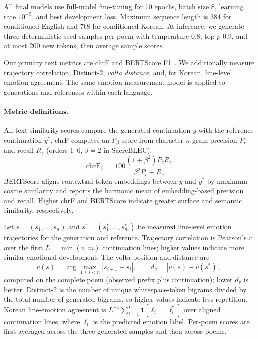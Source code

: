 \documentclass{article}
\begin{document}
All final models use full-model fine-tuning for 10 epochs, batch size 8, learning rate $10^{-5}$, and best development loss. Maximum sequence length is 384 for conditioned English and 768 for conditioned Korean. At inference, we generate three deterministic-seed samples per poem with temperature 0.8, top-$p$ 0.9, and at most 200 new tokens, then average sample scores.

Our primary text metrics are chrF and BERTScore F1~\citep{popovic2015chrf,zhang2020bertscore}. We additionally measure trajectory correlation, Distinct-2, \emph{volta distance}, and, for Korean, line-level emotion agreement. The same emotion measurement model is applied to generations and references within each language.

\paragraph{Metric definitions.}
All text-similarity scores compare the generated continuation $y$ with the reference continuation $y^*$. chrF computes an $F_{\beta}$ score from character $n$-gram precision $P_c$ and recall $R_c$ (orders 1--6, $\beta=2$ in SacreBLEU):
\begin{equation}
\operatorname{chrF}_{\beta}=100\frac{(1+\beta^2)P_cR_c}{\beta^2P_c+R_c}.
\end{equation}
BERTScore aligns contextual token embeddings between $y$ and $y^*$ by maximum cosine similarity and reports the harmonic mean of embedding-based precision and recall. Higher chrF and BERTScore indicate greater surface and semantic similarity, respectively.

Let $s=(s_1,\ldots,s_n)$ and $s^*=(s^*_1,\ldots,s^*_m)$ be measured line-level emotion trajectories for the generation and reference. Trajectory correlation is Pearson's $r$ over the first $L=\min(n,m)$ continuation lines; higher values indicate more similar emotional development. The volta position and distance are
\begin{equation}
v(s)=\arg\max_{1\leq i<n}|s_{i+1}-s_i|,\qquad
d_v=|v(s)-v(s^*)|,
\end{equation}
computed on the complete poem (observed prefix plus continuation); lower $d_v$ is better. Distinct-2 is the number of unique whitespace-token bigrams divided by the total number of generated bigrams, so higher values indicate less repetition. Korean line-emotion agreement is $L^{-1}\sum_{i=1}^{L}\mathbf{1}[\ell_i=\ell_i^*]$ over aligned continuation lines, where $\ell_i$ is the predicted emotion label. Per-poem scores are first averaged across the three generated samples and then across poems.
\end{document}
